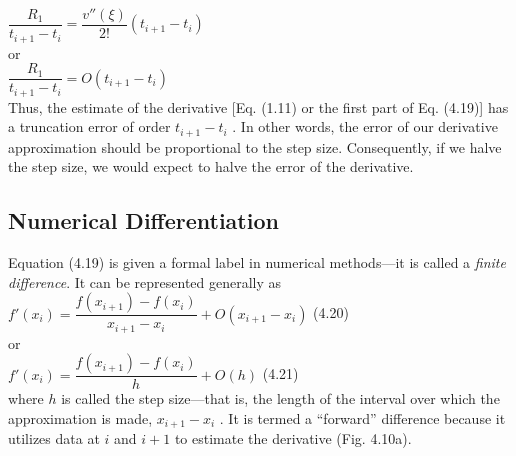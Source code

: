 \documentclass[../main.tex]{subfiles}
\begin{document}
$\dfrac{R_1}{t_{i+1}-t_i}=\dfrac{v''(\xi)}{2!}(t_{i+1}-t_i)$\\

\noindent
or\\

$\dfrac{R_1}{t_{i+1}-t_i}=O(t_{i+1}-t_i)$\\

\noindent
Thus, the estimate of the derivative [Eq. (1.11) or the first part of Eq. (4.19)] has a truncation
error of order $t_{i+1} - t_i$ . In other words, the error of our derivative approximation
should be proportional to the step size. Consequently, if we halve the step size, we would
expect to halve the error of the derivative.\\

\subsection{Numerical Differentiation}
\noindent
Equation (4.19) is given a formal label in numerical methods---it is called a \emph{finite difference}.
It can be represented generally as\\

$f'(x_i)=\dfrac{f(x_{i+1})-f(x_i)}{x_{i+1}-x_i} + O(x_{i+1}-x_i)$
\hfill
(4.20)\\

\noindent
or\\

$f'(x_i)=\dfrac{f(x_{i+1})-f(x_i)}{h} + O(h)$
\hfill
(4.21)\\

\noindent
where $h$ is called the step size---that is, the length of the interval over which the approximation
is made, $x_{i+1} - x_i$ . It is termed a ``forward'' difference because it utilizes data at $i$
and $i + 1$ to estimate the derivative (Fig. 4.10a).
\end{document}
